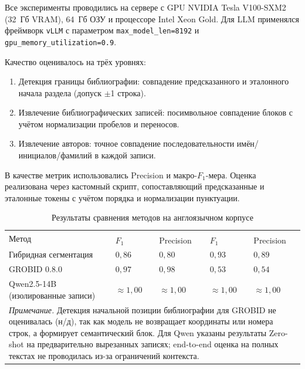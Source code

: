 Все эксперименты проводились на сервере с GPU NVIDIA Tesla V100-SXM2 (32~Гб VRAM), 64~Гб ОЗУ и процессоре Intel Xeon Gold. Для LLM применялся фреймворк \texttt{vLLM} с параметром \texttt{max\_model\_len=8192} и \texttt{gpu\_memory\_utilization=0.9}.

Качество оценивалось на трёх уровнях:
\begin{enumerate}
    \item Детекция границы библиографии: совпадение предсказанного и эталонного начала раздела (допуск $\pm$1 строка).
    \item Извлечение библиографических записей: посимвольное совпадение блоков с учётом нормализации пробелов и переносов.
    \item Извлечение авторов: точное совпадение последовательности имён/инициалов/фамилий в каждой записи.
\end{enumerate}
В качестве метрик использовались Precision и макро-$F_1$-мера. Оценка реализована через кастомный скрипт, сопоставляющий предсказанные и эталонные токены с учётом порядка и нормализации пунктуации.

\begin{table}[h]\centering
\footnotesize
\setlength{\tabcolsep}{3pt}
\renewcommand{\arraystretch}{1.2}
\caption{Результаты сравнения методов на англоязычном корпусе}
\label{tab:eng_benchmark}
\begin{tabularx}{\textwidth}{@{} l *{4}{>{\centering\arraybackslash}X} @{}}
\hline
\multirow{2}{*}{Метод} & \multicolumn{2}{c}{Выделение записей} & \multicolumn{2}{c}{Извлечение авторов} \\
\cline{2-5}
 & $F_1$ & Precision & $F_1$ & Precision \\
\hline
Гибридная сегментация~\cite{kopanichuk2025structure} & $0{,}86$ & $0{,}80$ & $0{,}93$ & $0{,}89$ \\
GROBID 0.8.0 & $0{,}97$ & $0{,}98$ & $0{,}53$ & $0{,}54$ \\
Qwen2.5-14B (изолированные записи) & $\approx 1{,}00$ & $\approx 1{,}00$ & $\approx 1{,}00$ & $\approx 1{,}00$ \\
\hline
\multicolumn{5}{p{\dimexpr\textwidth-2\tabcolsep\relax}}{\footnotesize\textit{Примечание.} Детекция начальной позиции библиографии для GROBID не оценивалась (н/д), так как модель не возвращает координаты или номера строк, а формирует семантический блок. Для Qwen указаны результаты Zero-shot на предварительно вырезанных записях; end-to-end оценка на полных текстах не проводилась из-за ограничений контекста.}
\end{tabularx}
\end{table}

